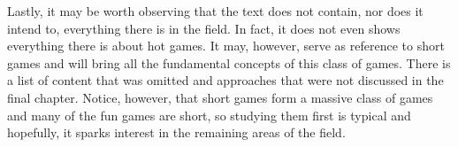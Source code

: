 Lastly, it may be worth observing that the text does not contain, nor does it intend to, everything there is in the field. In fact, it does not even shows everything there is about hot games. It may, however, serve as reference to short games and will bring all the fundamental concepts of this class of games. There is a list of content that was omitted and approaches that were not discussed in the final chapter. Notice, however, that short games form a massive class of games and many of the fun games are short, so studying them first is typical and hopefully, it sparks interest in the remaining areas of the field.













